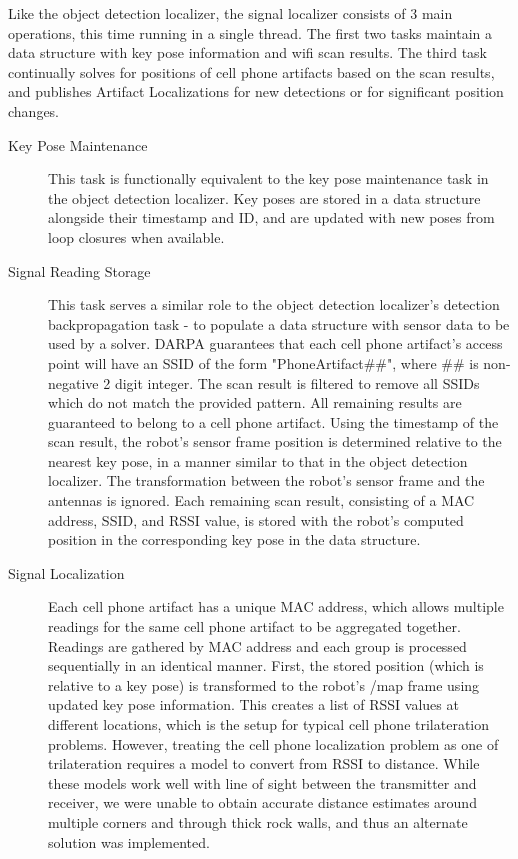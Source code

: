 Like the object detection localizer, the signal localizer consists of 3 main operations, this time running in a single thread. The first two tasks maintain a data structure with key pose information and wifi scan results. The third task continually solves for positions of cell phone artifacts based on the scan results, and publishes Artifact Localizations for new detections or for significant position changes.

\begin{description}
	\item[Key Pose Maintenance] This task is functionally equivalent to the key pose maintenance task in the object detection localizer. Key poses are stored in a data structure alongside their timestamp and ID, and are updated with new poses from loop closures when available.
	\item[Signal Reading Storage] This task serves a similar role to the object detection localizer's detection backpropagation task - to populate a data structure with sensor data to be used by a solver. DARPA guarantees that each cell phone artifact's access point will have an SSID of the form "PhoneArtifact\#\#", where \#\# is non-negative 2 digit integer. The scan result is filtered to remove all SSIDs which do not match the provided pattern. All remaining results are guaranteed to belong to a cell phone artifact. Using the timestamp of the scan result, the robot's sensor frame position is determined relative to the nearest key pose, in a manner similar to that in the object detection localizer. The transformation between the robot's sensor frame and the antennas is ignored. Each remaining scan result, consisting of a MAC address, SSID, and RSSI value, is stored with the robot's computed position in the corresponding key pose in the data structure.
	\item[Signal Localization] Each cell phone artifact has a unique MAC address, which allows multiple readings for the same cell phone artifact to be aggregated together. Readings are gathered by MAC address and each group is processed sequentially in an identical manner. First, the stored position (which is relative to a key pose) is transformed to the robot's /map frame using updated key pose information. This creates a list of RSSI values at different locations, which is the setup for typical cell phone trilateration problems. However, treating the cell phone localization problem as one of trilateration requires a model to convert from RSSI to distance. While these models work well with line of sight between the transmitter and receiver, we were unable to obtain accurate distance estimates around multiple corners and through thick rock walls, and thus an alternate solution was implemented.
	

\end{description}
